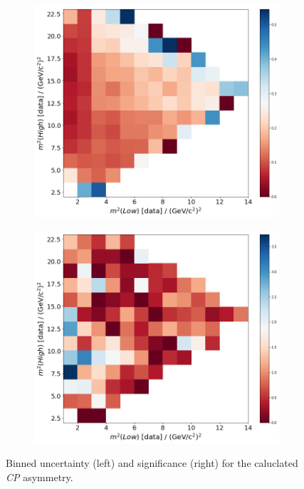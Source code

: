 \begin{figure}
  \centering
  \begin{subfigure}[b]{0.45\textwidth}
      \centering
      \includegraphics[width=\textwidth]{"content/pics/binned_unc_no_charm.png"}
  \end{subfigure}
  \hfill
  \begin{subfigure}[b]{0.45\textwidth}
      \centering
      \includegraphics[width=\textwidth]{"content/pics/binned_sig_no_charm.png"}
  \end{subfigure}
     \caption{Binned uncertainty (left) and significance (right) for the caluclated \textit{CP} asymmetry.}
     \label{fig:binned_unc_sig_no_charm}
\end{figure}
